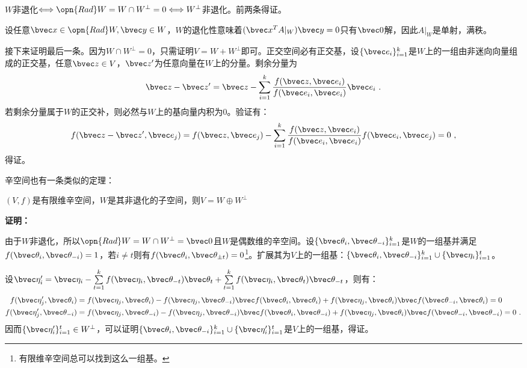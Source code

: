 $W$非退化$\Longleftrightarrow \opn{Rad}W=W\cap W^{\bot}=0\Longleftrightarrow  W^{\bot}$非退化。前两条得证。

设任意$\bvec x\in \opn{Rad} W,\bvec y\in W$，$W$的退化性意味着$(\bvec x^{T}A|_{W})\bvec  y=0$只有$\bvec 0$解，因此$A|_{W}$是单射，满秩。

接下来证明最后一条。因为$W\cap W^{\bot}=0$，只需证明$V=W+W^{\bot}$即可。正交空间必有正交基，设$\{\bvec e_i\}_{i=1}^k$是$W$上的一组由非迷向向量组成的正交基，任意$\bvec z\in V$，$\bvec z'$为任意向量在$W$上的分量。剩余分量为
\begin{equation}
\bvec z-\bvec z'=\bvec z-\sum\limits_{i=1}^k\frac{f(\bvec z,\bvec e_i)}{f(\bvec e_i,\bvec e_i)}\bvec e_i~.
\end{equation}
若剩余分量属于$W$的正交补，则必然与$W$上的基向量内积为$0$。验证有：
\begin{equation}
f(\bvec z-\bvec z',\bvec e_j)=f(\bvec z,\bvec e_j)-\sum\limits_{i=1}^k\frac{f(\bvec z,\bvec e_i)}{f(\bvec e_i,\bvec e_i)}f(\bvec e_i,\bvec e_j)=0~,
\end{equation}
得证。

辛空间也有一条类似的定理：
\begin{theorem}{}\label{the_OrSp_2}
$(V,f)$是有限维辛空间，$W$是其非退化的子空间，则$V=W\oplus W^{\bot}$
\end{theorem}
\textbf{证明：}

由于$W$非退化，所以$\opn{Rad} W=W\cap W^{\bot}={\bvec 0}$且$W$是偶数维的辛空间。设$\{\bvec \theta_i,\bvec \theta_{-i}\}_{i=1}^k$是$W$的一组基并满足$f(\bvec \theta_i,\bvec\theta_{-i})=1$，若$i\neq t$则有$f(\bvec\theta_i,\bvec\theta_{\pm t})= 0$\footnote{有限维辛空间总可以找到这么一组基。}。扩展其为$V$上的一组基：$\{\bvec \theta_i,\bvec \theta_{-i}\}_{i=1}^k\cup\{\bvec \eta_i\}_{i=1}^{t}$。

设$\bvec \eta'_i=\bvec\eta_i-\sum\limits_{t=1}^kf(\bvec \eta_i,\bvec \theta_{-t})\bvec\theta_t+\sum\limits_{t=1}^kf(\bvec\eta_i,\bvec\theta_t)\bvec\theta_{-t}$，则有：
\begin{equation}
\begin{aligned}
f(\bvec \eta'_j,\bvec  \theta_i)&=f(\bvec \eta_j,\bvec  \theta_i)-f(\bvec\eta_j,\bvec  \theta_{-i})\bvec f(\bvec \theta_i,\bvec \theta_i)+f(\bvec\eta_j,\bvec \theta_i)\bvec f(\bvec \theta_{-i},\bvec \theta_{i})=0\\
f(\bvec \eta'_j,\bvec  \theta_{-i})&=f(\bvec \eta_j,\bvec  \theta_{-i})-f(\bvec\eta_j,\bvec  \theta_{-i})\bvec f(\bvec \theta_i,\bvec \theta_{-i})+f(\bvec\eta_j,\bvec \theta_i)\bvec f(\bvec \theta_{-i},\bvec \theta_{-i})=0~.
\end{aligned}
\end{equation}
因而$\{\bvec \eta'_i\}_{i=1}^t\in W^{\bot}$，可以证明$\{\bvec \theta_i,\bvec \theta_{-i}\}_{i=1}^k\cup\{\bvec \eta'_i\}_{i=1}^t$是$V$上的一组基，得证。


